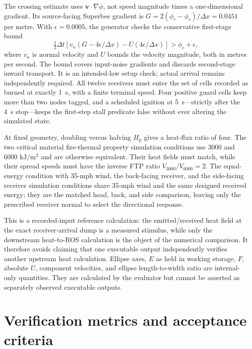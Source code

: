 The crossing estimate uses $\boldsymbol{v}\cdot\nabla\phi$, not speed
magnitude times a one-dimensional gradient. Its source-facing Superbee
gradient is $G=2(\phi_r-\phi_s)/\Delta x=0.0451$ per metre.
With $\epsilon=0.0005$, the generator checks the conservative first-stage
bound
\[
 \tfrac12\Delta t\left[v_n(G-4\epsilon/\Delta x)
       - U(4\epsilon/\Delta x)\right]>\phi_r+\epsilon,
\]
where $v_n$ is normal velocity and $U$ bounds the velocity magnitude, both
in metres per second. The bound covers input-noise gradients and discards
second-stage inward transport. It is an intended-law setup check; actual
arrival remains independently required. All twelve receivers must enter
the set of cells recorded as burned at exactly 1~s, with a finite terminal speed.
Four positive guard cells
keep more than two nodes tagged, and a scheduled ignition at 5~s---strictly
after the 4~s stop---keeps the first-step stall predicate false without ever
altering the simulated state.

At fixed geometry, doubling versus halving \(H_p\) gives a heat-flux ratio of
four. The two critical material fire-thermal property simulation conditions use 3000 and 6000
$\si{\kilo\joule\per\square\metre}$ and are otherwise equivalent. Their heat
fields must match, while their spread speeds must have the inverse FTP ratio
$V_{3000}/V_{6000}=2$. The
equal-energy condition with 35-mph wind, the back-facing receiver, and
the side-facing receiver simulation conditions share 35-mph wind and the same designed received
energy; they are the matched head, back, and side comparison, leaving only the
prescribed receiver normal to select the directional response.

This is a recorded-input reference calculation: the emitted/received heat field at the exact
receiver-arrival dump is a measured stimulus, while only the downstream
heat-to-ROS calculation is the object of the numerical comparison.  It
therefore avoids claiming that one executable
output independently verifies another upstream heat calculation.  Ellipse
axes, \(E\) as held in working storage, \(F\), absolute \(U\), component
velocities, and ellipse length-to-width ratio are internal-only quantities.  They are calculated
by the evaluator but cannot be asserted as separately observed executable
outputs.

\section{Verification metrics and acceptance criteria}

